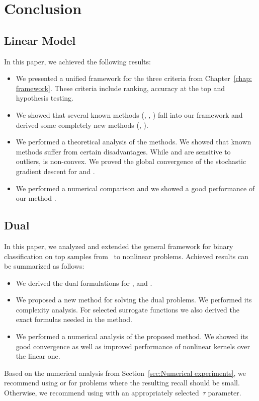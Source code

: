 \section{Conclusion}

\subsection{Linear Model}

In this paper, we achieved the following results:
\begin{itemize}
  \item We presented a unified framework for the three criteria from Chapter~\ref{chap: framework}. These criteria include ranking, accuracy at the top and hypothesis testing.
  \item We showed that several known methods (\TopPush, \Grill, \tauFPL) fall into our framework and derived some completely new methods (\PatMat, \PatMatNP).
  \item We performed a theoretical analysis of the methods. We showed that known methods suffer from certain disadvantages. While \TopPush and \tauFPL are sensitive to outliers, \Grill is non-convex. We proved the global convergence of the stochastic gradient descent for \PatMat and \PatMatNP.
  \item We performed a numerical comparison and we showed a good performance of our method \PatMatNP.
\end{itemize}


\subsection{Dual}\label{sec:Conclusion}

In this paper, we analyzed and extended the general framework for binary classification on top samples from~\cite{adam2021general} to nonlinear problems. Achieved results can be summarized as follows:
\begin{itemize}
  \item We derived the dual formulations for \TopPush, \TopPushK and \PatMat.
  \item We proposed a new method for solving the dual problems. We performed its complexity analysis. For selected surrogate functions we also derived the exact formulas needed in the method.
  \item We performed a numerical analysis of the proposed method. We showed its good convergence as well as improved performance of nonlinear kernels over the linear one.
\end{itemize}
Based on the numerical analysis from Section~\ref{sec:Numerical experiments}, we recommend using \TopPush or \TopPushK for problems where the resulting recall should be small. Otherwise, we recommend using \PatMat with an appropriately selected~$\tau$ parameter.

